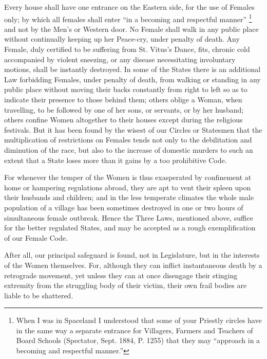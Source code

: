 \documentclass[12pt, a4paper, twoside]{memoir}
\begin{document}
Every house shall have one entrance on the Eastern side, for the use of
Females only; by which all females shall enter ``in a becoming and respectful
manner'' \footnote{ When I was in Spaceland I understood that some of your
Priestly circles have in the same way a separate entrance for Villagers,
Farmers and Teachers of Board Schools (Spectator, Sept. 1884, P. 1255) that
they may ``approach in a becoming and respectful manner.''} and not by the Men's
or Western door.  No Female shall walk in any public place without continually
keeping up her Peace-cry, under penalty of death.  Any Female, duly certified
to be suffering from St. Vitus's Dance, fits, chronic cold accompanied by
violent sneezing, or any disease necessitating involuntary motions, shall be
instantly destroyed.  In some of the States there is an additional Law
forbidding Females, under penalty of death, from walking or standing in any
public place without moving their backs constantly from right to left so as to
indicate their presence to those behind them; others oblige a Woman, when
travelling, to be followed by one of her sons, or servants, or by her husband;
others confine Women altogether to their houses except during the religious
festivals. But it has been found by the wisest of our Circles or Statesmen
that the multiplication of restrictions on Females tends not only to the
debilitation and diminution of the race, but also to the increase of domestic
murders to such an extent that a State loses more than it gains by a too
prohibitive Code.

For whenever the temper of the Women is thus exasperated by confinement at
home or hampering regulations abroad, they are apt to vent their spleen upon
their husbands and children; and in the less temperate climates the whole male
population of a village has been sometimes destroyed in one or two hours of
simultaneous female outbreak. Hence the Three Laws, mentioned above, suffice
for the better regulated States, and may be accepted as a rough
exemplification of our Female Code.

After all, our principal safeguard is found, not in Legislature, but in the
interests of the Women themselves. For, although they can inflict
instantaneous death by a retrograde movement, yet unless they can at once
disengage their stinging extremity from the struggling body of their victim,
their own frail bodies are liable to be shattered.
\end{document}
